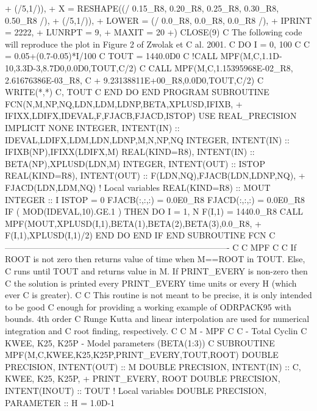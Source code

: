 {{     +        (/5,1/)),
     +    X = RESHAPE((/ 0.15_R8, 0.20_R8, 0.25_R8, 0.30_R8, 0.50_R8 /),
     +        (/5,1/)),
     +    LOWER = (/ 0.0_R8, 0.0_R8, 0.0_R8 /),
     +    IPRINT = 2222,
     +    LUNRPT = 9,
     +    MAXIT  = 20
     +)
      CLOSE(9)
C  The following code will reproduce the plot in Figure 2 of Zwolak et
C  al. 2001.
C      DO I = 0, 100
C          C = 0.05+(0.7-0.05)*I/100
C          TOUT = 1440.0D0
C          !CALL MPF(M,C,1.1D-10,3.3D-3,8.7D0,0.0D0,TOUT,C/2)
C          CALL MPF(M,C,1.15395968E-02_R8, 2.61676386E-03_R8, 
C     +             9.23138811E+00_R8,0.0D0,TOUT,C/2)
C          WRITE(*,*) C, TOUT
C      END DO
      END PROGRAM
\phantom{blank line}
      SUBROUTINE FCN(N,M,NP,NQ,LDN,LDM,LDNP,BETA,XPLUSD,IFIXB,
     +    IFIXX,LDIFX,IDEVAL,F,FJACB,FJACD,ISTOP)
      USE REAL_PRECISION
      IMPLICIT NONE
      INTEGER, INTENT(IN) :: IDEVAL,LDIFX,LDM,LDN,LDNP,M,N,NP,NQ
      INTEGER, INTENT(IN) :: IFIXB(NP),IFIXX(LDIFX,M)
      REAL(KIND=R8), INTENT(IN) :: BETA(NP),XPLUSD(LDN,M)
      INTEGER, INTENT(OUT) :: ISTOP
      REAL(KIND=R8), INTENT(OUT) :: F(LDN,NQ),FJACB(LDN,LDNP,NQ),
     +    FJACD(LDN,LDM,NQ)
      ! Local variables
      REAL(KIND=R8) :: MOUT
      INTEGER :: I
      ISTOP = 0
      FJACB(:,:,:) = 0.0E0_R8
      FJACD(:,:,:) = 0.0E0_R8
      IF ( MOD(IDEVAL,10).GE.1 ) THEN
          DO I = 1, N
              F(I,1) = 1440.0_R8
              CALL MPF(MOUT,XPLUSD(I,1),BETA(1),BETA(2),BETA(3),0.0_R8,
     +            F(I,1),XPLUSD(I,1)/2)
          END DO
      END IF
      END SUBROUTINE FCN
\phantom{blank line}
C-------------------------------------------------------------------------------
C
C  MPF
C
C  If ROOT is not zero then returns value of time when M==ROOT in TOUT.  Else,
C  runs until TOUT and returns value in M.  If PRINT_EVERY is non-zero then
C  the solution is printed every PRINT_EVERY time units or every H (which ever
C  is greater).
C
C  This routine is not meant to be precise, it is only intended to be good
C  enough for providing a working example of ODRPACK95 with bounds.  4th order 
C  Runge Kutta and linear interpolation are used for numerical integration and
C  root finding, respectively.
C
C  M - MPF
C  C - Total Cyclin
C  KWEE, K25, K25P - Model parameters (BETA(1:3))
C
      SUBROUTINE MPF(M,C,KWEE,K25,K25P,PRINT_EVERY,TOUT,ROOT)
          DOUBLE PRECISION, INTENT(OUT) :: M
          DOUBLE PRECISION, INTENT(IN)  :: C, KWEE, K25, K25P,
     +        PRINT_EVERY, ROOT
          DOUBLE PRECISION, INTENT(INOUT) :: TOUT
          !  Local variables
          DOUBLE PRECISION, PARAMETER :: H = 1.0D-1
}}
